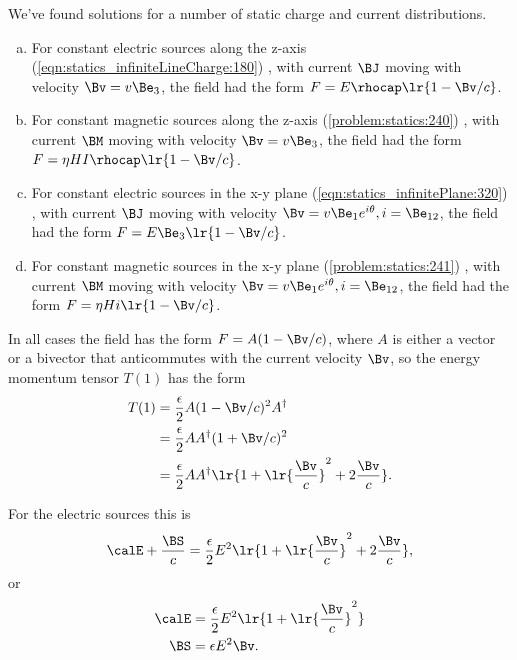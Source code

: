 %
%

We've found solutions for a number of static charge and current distributions.

\begin{enumerate}[(a)]
\item For constant electric sources along the z-axis
(\cref{eqn:statics_infiniteLineCharge:180})
, with current \( \BJ \) moving with velocity \( \Bv = v \Be_3 \), the field had the form \( F = E \rhocap \lr{ 1 - \Bv/c } \).
\item For constant magnetic sources along the z-axis
(\cref{problem:statics:240})
, with current \( \BM \) moving with velocity \( \Bv = v \Be_3 \), the field had the form \( F = \eta H I \rhocap \lr{ 1 - \Bv/c } \).
\item For constant electric sources in the x-y plane
(\cref{eqn:statics_infinitePlane:320})
, with current \( \BJ \) moving with velocity \( \Bv = v \Be_1 e^{i\theta}, i = \Be_{12} \), the field had the form \( F = E \Be_3 \lr{ 1 - \Bv/c } \).
\item For constant magnetic sources in the x-y plane
(\cref{problem:statics:241})
, with current \( \BM \) moving with velocity \( \Bv = v \Be_1 e^{i\theta}, i = \Be_{12} \), the field had the form \( F = \eta H i \lr{ 1 - \Bv/c } \).
\end{enumerate}

In all cases the field has the form \( F = A ( 1 - \Bv/c ) \), where \( A \) is either a vector or a bivector that anticommutes with the current velocity \( \Bv \), so the energy momentum tensor \( T(1) \) has the form
\begin{equation}\label{eqn:poyntingStaticExamples:860}
\begin{aligned}
T(1)
&= \frac{\epsilon}{2} A ( 1 - \Bv/c )^2 A^\dagger \\
&= \frac{\epsilon}{2} A A^\dagger ( 1 + \Bv/c )^2 \\
&= \frac{\epsilon}{2} A A^\dagger \lr{ 1 + \lr{ \frac{\Bv}{c} }^2 + 2 \frac{\Bv}{c} }.
\end{aligned}
\end{equation}

For the electric sources this is
\begin{equation}\label{eqn:poyntingStaticExamples:880}
\calE + \frac{\BS}{c} = \frac{\epsilon}{2} E^2 \lr{ 1 + \lr{ \frac{\Bv}{c} }^2 + 2 \frac{\Bv}{c} },
\end{equation}
or
\begin{equation}\label{eqn:poyntingStaticExamples:900}
\begin{aligned}
\calE &= \frac{\epsilon}{2} E^2 \lr{ 1 + \lr{ \frac{\Bv}{c} }^2 } \\
\BS &= \epsilon E^2 \Bv.
\end{aligned}
\end{equation}

